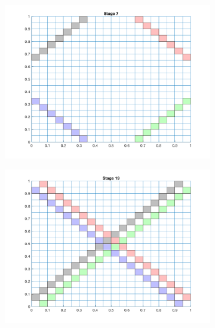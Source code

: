 \documentclass[11pt, letterpaper,titlepage,oneside]{article}
\begin{document}
\begin{figure}[H]
  \centering
  \begin{subfigure}{0.49\textwidth}
  \includegraphics[scale=0.5]{../figures/regular_partition_1.png}
  \end{subfigure}
  \begin{subfigure}{0.49\textwidth}
  \includegraphics[scale=0.5]{../figures/regular_partition_2.png}
  \end{subfigure}
  \begin{subfigure}{0.49\textwidth}

\end{subfigure}
\end{figure}
\end{document}

